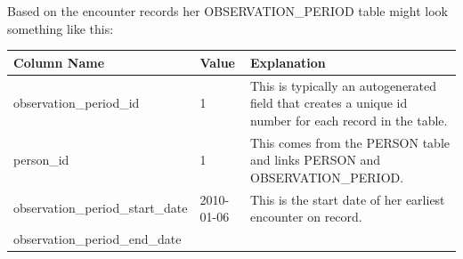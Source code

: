 \documentclass[]{book}
\begin{document}
Based on the encounter records her OBSERVATION\_PERIOD table might look something like this:

\begin{longtable}[]{@{}lll@{}}
\toprule
\begin{minipage}[b]{0.33\columnwidth}\raggedright
Column Name\strut
\end{minipage} & \begin{minipage}[b]{0.15\columnwidth}\raggedright
Value\strut
\end{minipage} & \begin{minipage}[b]{0.43\columnwidth}\raggedright
Explanation\strut
\end{minipage}\tabularnewline
\midrule
\endhead
\begin{minipage}[t]{0.33\columnwidth}\raggedright
observation\_period\_id\strut
\end{minipage} & \begin{minipage}[t]{0.15\columnwidth}\raggedright
1\strut
\end{minipage} & \begin{minipage}[t]{0.43\columnwidth}\raggedright
This is typically an autogenerated field that creates a unique id number for each record in the table.\strut
\end{minipage}\tabularnewline
\begin{minipage}[t]{0.33\columnwidth}\raggedright
person\_id\strut
\end{minipage} & \begin{minipage}[t]{0.15\columnwidth}\raggedright
1\strut
\end{minipage} & \begin{minipage}[t]{0.43\columnwidth}\raggedright
This comes from the PERSON table and links PERSON and OBSERVATION\_PERIOD.\strut
\end{minipage}\tabularnewline
\begin{minipage}[t]{0.33\columnwidth}\raggedright
observation\_period\_start\_date\strut
\end{minipage} & \begin{minipage}[t]{0.15\columnwidth}\raggedright
2010-01-06\strut
\end{minipage} & \begin{minipage}[t]{0.43\columnwidth}\raggedright
This is the start date of her earliest encounter on record.\strut
\end{minipage}\tabularnewline
\begin{minipage}[t]{0.33\columnwidth}\raggedright
observation\_period\_end\_date\strut
\end{minipage} & \begin{minipage}[t]{0.15\columnwidth}\raggedright

\end{minipage}
\end{longtable}
\end{document}
